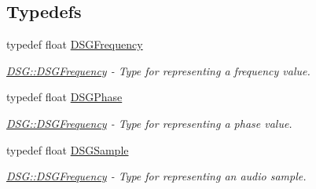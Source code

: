 \subsection*{Typedefs}
\begin{DoxyCompactItemize}
\item 
typedef float \hyperlink{namespace_d_s_g_a4315a061386fa1014fda09b15d3a6973}{D\+S\+G\+Frequency}
\begin{DoxyCompactList}\small\item\em \hyperlink{namespace_d_s_g_a4315a061386fa1014fda09b15d3a6973}{D\+S\+G\+::\+D\+S\+G\+Frequency} -\/ Type for representing a frequency value. \end{DoxyCompactList}\item 
typedef float \hyperlink{namespace_d_s_g_a44431ce1eb0a7300efdd207bc879e52c}{D\+S\+G\+Phase}
\begin{DoxyCompactList}\small\item\em \hyperlink{namespace_d_s_g_a4315a061386fa1014fda09b15d3a6973}{D\+S\+G\+::\+D\+S\+G\+Frequency} -\/ Type for representing a phase value. \end{DoxyCompactList}\item 
typedef float \hyperlink{namespace_d_s_g_ac39a94cd27ebcd9c1e7502d0c624894a}{D\+S\+G\+Sample}
\begin{DoxyCompactList}\small\item\em \hyperlink{namespace_d_s_g_a4315a061386fa1014fda09b15d3a6973}{D\+S\+G\+::\+D\+S\+G\+Frequency} -\/ Type for representing an audio sample. \end{DoxyCompactList}\end{DoxyCompactItemize}
